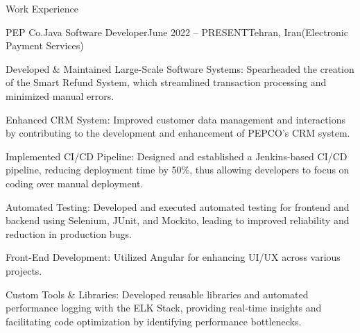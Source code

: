 \documentclass[]{kyvernitis-resume}
\begin{document}
\begin{section}{Work Experience}
    \begin{subsection}{PEP Co.}{Java Software Developer}{June 2022 -- PRESENT}{Tehran, Iran}{(Electronic Payment Services)}

		\item Developed \& Maintained Large-Scale Software Systems: Spearheaded the creation of the Smart Refund System, which streamlined transaction processing and minimized manual errors.
		\item Enhanced CRM System: Improved customer data management and interactions by contributing to the development and enhancement of PEPCO's CRM system.
		\item Implemented CI/CD Pipeline: Designed and established a Jenkins-based CI/CD pipeline, reducing deployment time by 50\%, thus allowing developers to focus on coding over manual deployment.

		\item Automated Testing: Developed and executed automated testing for frontend and backend using Selenium, JUnit, and Mockito, leading to improved reliability and reduction in production bugs.
		\item Front-End Development: Utilized Angular for enhancing UI/UX across various projects.
		\item Custom Tools \& Libraries: Developed reusable libraries and automated performance logging with the ELK Stack, providing real-time insights and facilitating code optimization by identifying performance bottlenecks.

    \end{subsection}

\hfill


\end{section}
\end{document}
